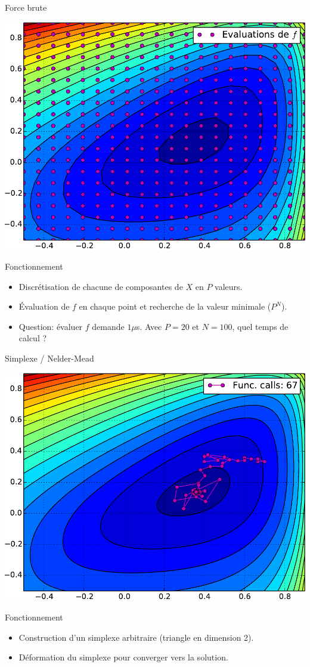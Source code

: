 \documentclass[8pt,a4paper]{beamer}
\begin{document}
\begin{frame}{Force brute}
  
  \begin{center}
  \includegraphics[width = .65\textwidth]{figures/brachi_BF.pdf}
  \end{center}
  
  
  \begin{block}{Fonctionnement}
  \begin{itemize}
  \item Discrétisation de chacune de composantes de $X$ en $P$ valeurs.
  \item Évaluation de $f$ en chaque point et recherche de la valeur minimale ($P^N$).
  \item Question: évaluer $f$ demande $1\mu$s. Avec $P=20$ et $N=100$, quel temps de calcul ?
  \end{itemize}
  \end{block}
 
\end{frame}




\begin{frame}{Simplexe / Nelder-Mead}
  
  \begin{center}
  \includegraphics[width = .65\textwidth]{figures/brachi_NM.pdf}
  \end{center}
  
  
  \begin{block}{Fonctionnement}
  \begin{itemize}
  \item Construction d'un simplexe arbitraire (triangle en dimension 2).
  \item Déformation du simplexe pour converger vers la solution.
  \end{itemize}
  \end{block}
 
\end{frame}
\end{document}
